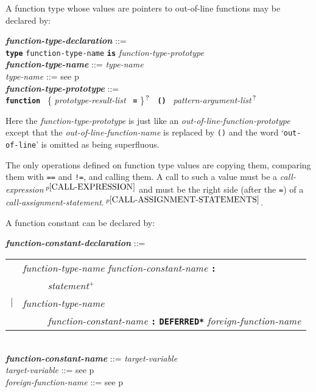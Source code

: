 \documentclass[12pt]{article}
\newcommand{\TT}[1]{{\tt \bfseries #1}}
\newcommand{\PLUS}[1][]{{$^{+#1}$}}
\newcommand{\QMARK}{{$^{\,\mbox{\footnotesize ?}}$}}
\newcommand{\ttkey}[1]{{\tt \bfseries #1}}
\newcommand{\emkey}[1]{{\em \bfseries #1}}
\newcommand{\pagref}[1]{p\pageref{#1}}
\newcommand{\pagnote}[1]{$\,^{p\pageref{#1}}$}
\newenvironment{indpar}[1][0.3in]%
	{\begin{list}{}%
		     {\setlength{\itemsep}{0in}%
		      \setlength{\topsep}{0in}%
		      \setlength{\parsep}{1ex}%
		      \setlength{\labelwidth}{#1}%
		      \setlength{\leftmargin}{#1}%
		      \addtolength{\leftmargin}{\labelsep}}%
	 \item}%
	{\end{list}}
\begin{document}
A function type whose values are pointers to out-of-line
functions may be declared by:

\begin{indpar}
\emkey{function-type-declaration}\label{FUNCTION-TYPE-DECLARATION} ::= \\
\hspace*{0.5in}
    \ttkey{type} {\tt function-type-name} \TT{is}
                 {\em function-type-prototype}
\\[0.5ex]
\emkey{function-type-name} ::= {\em type-name}
\\[0.5ex]
{\em type-name} ::= see \pagref{TYPE-NAME}
\\[0.5ex]
\emkey{function-type-prototype}%
	\label{FUNCTION-TYPE-PROTOTYPE} ::= \\
\hspace*{0.25in} \ttkey{function}~
        \{ {\em prototype-result-list}~ \TT{=} \}\QMARK{}~
	\TT{()}~ {\em pattern-argument-list}\QMARK{}
\end{indpar}

Here the {\em function-type-prototype} is just like an
{\em out-of-line-function-prototype} except that the
{\em out-of-line-function-name} is replaced by {\tt ()} and
the word `{\tt out-of-line}' is omitted as being superfluous.

The only operations defined on function type values are copying them,
comparing them with {\tt ==} and {\tt !=}, and
calling them.  A call to such a value must be a
{\em call-expression}\pagnote{CALL-EXPRESSION} and
must be the right side (after the {\tt =})
of a {\em call-assignment-state\-ment}.\pagnote{CALL-ASSIGNMENT-STATEMENTS}.

A function constant can be declared by:
\begin{indpar}
\emkey{function-constant-declaration}%
    \label{FUNCTION-CONSTANT-DECLARATION} ::= \\
\hspace*{0.5in}
    \begin{tabular}[t]{rl}
        &  {\em function-type-name} {\em function-constant-name} \TT{:} \\
	& \TT{~~~~~}{\em statement}\PLUS{} \\
    $|$ &  {\em function-type-name} \\
        &  \TT{~~~~~}{\em function-constant-name} \TT{:}
    	   \TT{*DEFERRED*} {\em foreign-function-name} \\
    \end{tabular}
\\[0.5ex]
\emkey{function-constant-name} ::= {\em target-variable}
\\[0.5ex]
{\em target-variable} ::= see \pagref{TARGET-VARIABLE}
\\[0.5ex]
{\em foreign-function-name} ::= see \pagref{FOREIGN-FUNCTION-NAME}
\end{indpar}
\end{document}

